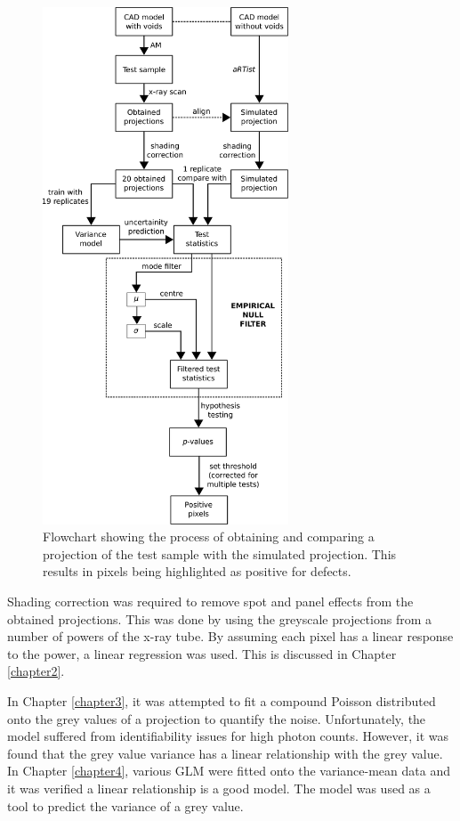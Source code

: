\documentclass[12pt, a4paper, oneside]{memoir}
\begin{document}
\begin{figure}
  \centering
  \includegraphics[width=0.65\textwidth]{../figures/flowchart.pdf}
  \caption{Flowchart showing the process of obtaining and comparing a projection of the test sample with the simulated projection. This results in pixels being highlighted as positive for defects.}
  \label{fig:evaluation_flowchart}
\end{figure}

Shading correction was required to remove spot and panel effects from the obtained projections. This was done by using the greyscale projections from a number of powers of the x-ray tube. By assuming each pixel has a linear response to the power, a linear regression was used. This is discussed in Chapter \ref{chapter2}.

In Chapter \ref{chapter3}, it was attempted to fit a compound Poisson distributed onto the grey values of a projection to quantify the noise. Unfortunately, the model suffered from identifiability issues for high photon counts. However, it was found that the grey value variance has a linear relationship with the grey value. In Chapter \ref{chapter4}, various GLM were fitted onto the variance-mean data and it was verified a linear relationship is a good model. The model was used as a tool to predict the variance of a grey value.
\end{document}
